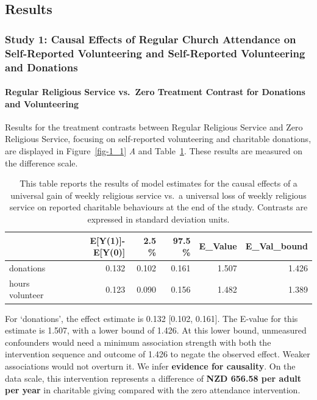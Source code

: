 \documentclass[
  single column]{article}
\let\oldparagraph\paragraph
\renewcommand{\paragraph}[1]{\oldparagraph{#1}\mbox{}}
\begin{document}
\newpage{}

\subsection{Results}\label{results}

\subsubsection{Study 1: Causal Effects of Regular Church Attendance on
Self-Reported Volunteering and Self-Reported Volunteering and
Donations}\label{study-1-causal-effects-of-regular-church-attendance-on-self-reported-volunteering-and-self-reported-volunteering-and-donations}

\paragraph{Regular Religious Service vs.~Zero Treatment Contrast for
Donations and
Volunteering}\label{regular-religious-service-vs.-zero-treatment-contrast-for-donations-and-volunteering}

Results for the treatment contrasts between Regular Religious Service
and Zero Religious Service, focusing on self-reported volunteering and
charitable donations, are displayed in Figure~\ref{fig-1_1} \emph{A} and
Table~\ref{tbl-1_1}. These results are measured on the difference scale.

\begin{longtable}[]{@{}lrrrrr@{}}

\caption{\label{tbl-1_1}This table reports the results of model
estimates for the causal effects of a universal gain of weekly religious
service vs.~a universal loss of weekly religious service on reported
charitable behaviours at the end of the study. Contrasts are expressed
in standard deviation units.}

\tabularnewline

\toprule\noalign{}
& E{[}Y(1){]}-E{[}Y(0){]} & 2.5 \% & 97.5 \% & E\_Value &
E\_Val\_bound \\
\midrule\noalign{}
\endhead
\bottomrule\noalign{}
\endlastfoot
donations & 0.132 & 0.102 & 0.161 & 1.507 & 1.426 \\
hours volunteer & 0.123 & 0.090 & 0.156 & 1.482 & 1.389 \\

\end{longtable}

For `donations', the effect estimate is 0.132 {[}0.102, 0.161{]}. The
E-value for this estimate is 1.507, with a lower bound of 1.426. At this
lower bound, unmeasured confounders would need a minimum association
strength with both the intervention sequence and outcome of 1.426 to
negate the observed effect. Weaker associations would not overturn it.
We infer \textbf{evidence for causality}. On the data scale, this
intervention represents a difference of \textbf{NZD 656.58 per adult per
year} in charitable giving compared with the zero attendance
intervention.
\end{document}
